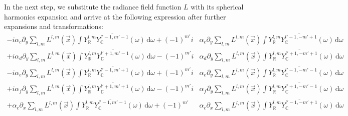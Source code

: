 \documentclass{egpubl}
\newcommand{\ud}{\,\mathrm{d}} %
\newcommand{\SHBC}{Y_{\mathbb{C}}} %
\begin{document}
In the next step, we substitute the radiance field function $L$ with its spherical harmonics expansion and arrive at the following expression after further expansions and transformations:
\begin{align}
-i\alpha_c\partial_y\sum_{l,m}L^{l,m}\left (\vec{x}\right)\int{Y_{\mathbb{R}}^{l,m}\overline{\SHBC^{l'-1, m'-1}}(\omega )\ud\omega}
+\left({-1}\right)^{m'}i&\alpha_c\partial_y\sum_{l,m}L^{l,m}\left (\vec{x}\right)\int{Y_{\mathbb{R}}^{l,m}\overline{\SHBC^{l'-1, -m'+1}}(\omega )\ud\omega}
\label{eq:real_transport_expansion_unsimplified_term1_term2}
\\
+i\alpha_d\partial_y\sum_{l,m}L^{l,m}\left (\vec{x}\right)\int{Y_{\mathbb{R}}^{l,m}\overline{\SHBC^{l'+1, m'-1}}(\omega )\ud\omega}
-\left({-1}\right)^{m'} i &\alpha_d\partial_y\sum_{l,m}L^{l,m}\left (\vec{x}\right)\int{Y_{\mathbb{R}}^{l,m}\overline{\SHBC^{l'+1, -m'+1}}(\omega )\ud\omega}
\label{eq:real_transport_expansion_unsimplified_term3_term4}
\\
-i\alpha_e \partial_y\sum_{l,m}L^{l,m}\left (\vec{x}\right)\int{Y_{\mathbb{R}}^{l,m}\overline{\SHBC^{l'-1, m'+1}}(\omega )\ud\omega}
+\left({-1}\right)^{m'}i &\alpha_e \partial_y\sum_{l,m}L^{l,m}\left (\vec{x}\right)\int{Y_{\mathbb{R}}^{l,m}\overline{\SHBC^{l'-1, -m'-1}}(\omega )\ud\omega}
\\
+i\alpha_f \partial_y\sum_{l,m}L^{l,m}\left (\vec{x}\right)\int{Y_{\mathbb{R}}^{l,m}\overline{\SHBC^{l'+1, m'+1}}(\omega )\ud\omega}
-\left({-1}\right)^{m'}i &\alpha_f \partial_y\sum_{l,m}L^{l,m}\left (\vec{x}\right)\int{Y_{\mathbb{R}}^{l,m}\overline{\SHBC^{l'+1, -m'-1}}(\omega )\ud\omega}
\\
+\alpha_c\partial_x\sum_{l,m}L^{l,m}\left (\vec{x}\right)\int{Y_{\mathbb{R}}^{l,m}\overline{\SHBC^{l'-1, m'-1}}(\omega )\ud\omega}
+\left({-1}\right)^{m'}&\alpha_c\partial_x\sum_{l,m}L^{l,m}\left (\vec{x}\right)\int{Y_{\mathbb{R}}^{l,m}\overline{\SHBC^{l'-1, -m'+1}}(\omega )\ud\omega}

\end{align}
\end{document}
